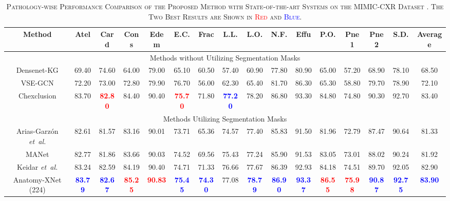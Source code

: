 \documentclass[journal]{IEEEtran}
\newcommand{\etal}{\emph{et~al.}}
\begin{document}
\begin{table*}[!t]
    \centering
    \caption{\textsc{Pathology-wise Performance Comparison of the Proposed Method with State-of-the-art Systems on the MIMIC-CXR Dataset . The Two Best Results are Shown in \textcolor{red}{Red} and \textcolor{blue}{Blue}.}}
    \label{mimic_comparison}
    \begin{adjustbox}{width=\textwidth}
    \begin{threeparttable}[b]
    \begin{tabular}{c|cccccccccccccc|c} 
    \hline
    \toprule 
    \bf Method & \bf Atel & \bf Card & \bf Cons & \bf Edem & \bf E.C. & \bf Frac & \bf L.L. & \bf L.O. & \bf N.F. & \bf Effu & \bf P.O. & \bf Pne1 & \bf Pne2 & \bf S.D. & \bf Average \\
    \hline\hline
    \multicolumn{16}{c}{Methods without Utilizing Segmentation Masks} \\
    \hline
    Densenet-KG \cite{Zhang_Wang_Xu_Yu_Yuille_Xu_2020} & 69.40 & 74.60 & 64.00 & 79.00 & 65.10 & 60.50 & 57.40 & 60.90 & 77.80 & 80.90 & 65.00 & 57.20 & 68.90 & 78.10 & 68.50 \\
    VSE-GCN \cite{Hou2021MultiLabelLW} & 72.20 & 73.00 & 72.80 & 79.90 & 76.70 & 56.00 & 62.30 & 65.40 & 81.70 & 86.30 & 65.30 & 58.80 & 79.70 & 78.90 & 72.10 \\ 
    Chexclusion \cite{SeyyedKalantari2021CheXclusionFG}  & 83.70 & \textcolor{red}{\bf 82.80} & 84.40 & 90.40 & \textcolor{red}{\bf 75.70} & 71.80 & \textcolor{blue}{\bf 77.20} & 78.20 & 86.80 & 93.30 & 84.80 & 74.80 & 90.30 & 92.70 & 83.40 \\
    \hline
    \multicolumn{16}{c}{Methods Utilizing Segmentation Masks} \\
    \hline
    Arias-Garzón \etal \cite{ARIASGARZON2021100138} & 82.61 & 81.57 & 83.16 & 90.01 & 73.71 & 65.36 & 74.57  & 77.40 & 85.83 & 91.50 & 81.96 & 72.79 & 87.47  & 90.64 & 81.33 \\
    MANet \cite{XU202196} & 82.77 & 81.86 & 83.66 & 90.03 & 74.52 & 69.56 & 75.43 & 77.24 & 85.90 & 91.53 & 83.05 & 73.01 & 88.02 & 90.24 & 81.92 \\
    Keidar \etal \cite{Keidar2021} & 83.24 & 82.59 & 84.19 & 90.40 & 74.71 & 71.33 & 76.66 & 77.67 & 86.39 & 92.93 & 84.18 & 74.51 & 89.70 & 92.05 & 82.90 \\
    Anatomy-XNet (224) & \textcolor{blue}{\bf 83.79} & \textcolor{blue}{\bf 82.67} & \textcolor{red}{\bf 85.25} & \textcolor{red}{\bf 90.83} & \textcolor{blue}{\bf 75.45} & \textcolor{blue}{\bf 74.30} & 77.08 & \textcolor{blue}{\bf 78.79} & \textcolor{blue}{\bf 86.90} & \textcolor{blue}{\bf 93.37} & \textcolor{red}{\bf 86.55} & \textcolor{red}{\bf 75.98} & \textcolor{blue}{\bf 90.87} & \textcolor{blue}{\bf 92.75} & \textcolor{blue}{\bf 83.90} \\ 

\end{tabular}
\end{threeparttable}
\end{adjustbox}
\end{table*}
\end{document}
